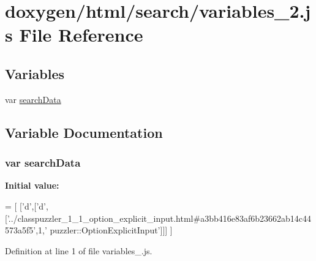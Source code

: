 \hypertarget{a00106}{}\section{doxygen/html/search/variables\+\_\+2.js File Reference}
\label{a00106}
\subsection*{Variables}
\begin{DoxyCompactItemize}
\item 
var \hyperlink{a00106_ad01a7523f103d6242ef9b0451861231e}{search\+Data}
\end{DoxyCompactItemize}


\subsection{Variable Documentation}
\hypertarget{a00106_ad01a7523f103d6242ef9b0451861231e}{}
\subsubsection[{search\+Data}]{\setlength{\rightskip}{0pt plus 5cm}var search\+Data}\label{a00106_ad01a7523f103d6242ef9b0451861231e}
{\bfseries Initial value\+:}
\begin{DoxyCode}
=
[
  [\textcolor{charliteral}{'d'},[\textcolor{charliteral}{'d'},[\textcolor{stringliteral}{'../classpuzzler\_1\_1\_option\_explicit\_input.html#a3bb416e83af6b23662ab14c44573a5f5'},1,\textcolor{stringliteral}{'
      puzzler::OptionExplicitInput'}]]]
]
\end{DoxyCode}


Definition at line 1 of file variables\+\_.\+js.

